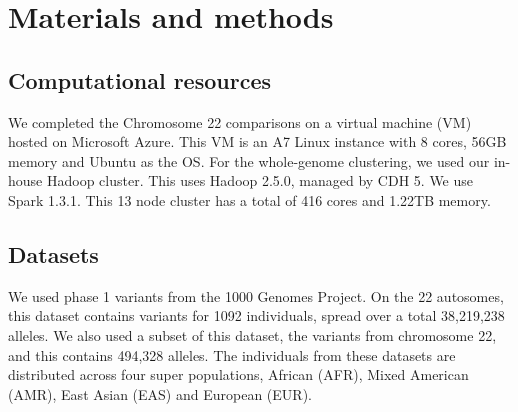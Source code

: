 \documentclass{bmcart}
\begin{document}
\section*{Materials and methods}
\subsection*{Computational resources}
We completed the Chromosome 22 comparisons on a virtual machine (VM) hosted on Microsoft Azure. This VM is an A7 Linux instance with 8 cores, 56GB memory and Ubuntu as the OS. 
For the whole-genome clustering, we used our in-house Hadoop cluster. This uses Hadoop 2.5.0, managed by CDH 5. We use Spark 1.3.1. This 13 node cluster has a total of 416 cores and 1.22TB memory.


\subsection*{Datasets}
We used  phase 1 variants from the 1000 Genomes Project. On the 22 autosomes, this dataset contains variants for 1092 individuals, spread over a total 38,219,238 alleles.
We also used a subset of this dataset, the variants from chromosome 22, and this contains 494,328 alleles.
The individuals from these datasets are distributed across four super populations, African (AFR), Mixed American (AMR), East Asian (EAS) and European (EUR).
\end{document}
